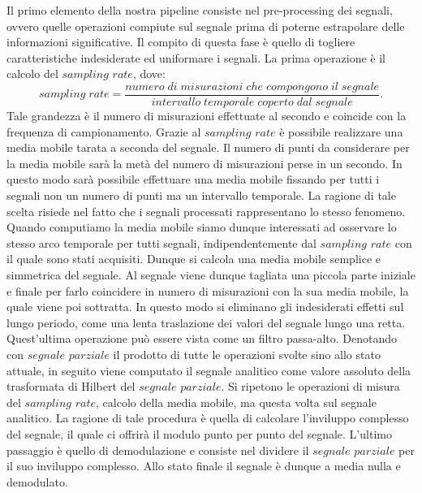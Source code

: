 \documentclass[12pt,a4paper, twoside, openright]{report}
\begin{document}
Il primo elemento della nostra pipeline consiste nel pre-processing dei segnali, ovvero quelle operazioni compiute sul segnale prima di poterne estrapolare delle informazioni significative.
Il compito di questa fase è quello di togliere caratteristiche indesiderate ed uniformare i segnali.
La prima operazione è il calcolo del $sampling$ $rate$, dove:
\begin{equation}
	sampling\; rate = \frac{numero\; di\; misurazioni\; che\; compongono\; il\; 				segnale}{intervallo\; temporale\; coperto\; dal\; segnale}.
\end{equation}
Tale grandezza è il numero di misurazioni effettuate al secondo e coincide con la frequenza di campionamento.
Grazie al $sampling$ $rate$ è possibile realizzare una media mobile tarata a seconda del segnale.
Il numero di punti da considerare per la media mobile sarà la metà del numero di misurazioni perse in un secondo.
In questo modo sarà possibile effettuare una media mobile fissando per tutti i segnali non un numero di punti ma un intervallo temporale.
La ragione di tale scelta risiede nel fatto che i segnali processati rappresentano lo stesso fenomeno.
Quando computiamo la media mobile siamo dunque interessati ad osservare lo stesso arco temporale per tutti segnali, indipendentemente dal $sampling$ $rate$ con il quale sono stati acquisiti.
Dunque si calcola una media mobile semplice e simmetrica del segnale.
Al segnale viene dunque tagliata una piccola parte iniziale e finale per farlo coincidere in numero di misurazioni con la sua media mobile, la quale viene poi sottratta.
In questo modo si eliminano gli indesiderati effetti sul lungo periodo, come una lenta traslazione dei valori del segnale lungo una retta.
Quest'ultima operazione può essere vista come un filtro passa-alto.
Denotando con $segnale$ $parziale$ il prodotto di tutte le operazioni svolte sino allo stato attuale, in seguito viene computato il segnale analitico come valore assoluto della trasformata di Hilbert del $segnale$ $parziale$.
Si ripetono le operazioni di misura del $sampling$ $rate$, calcolo della media mobile, ma questa volta sul segnale analitico.
La ragione di tale procedura è quella di calcolare l'inviluppo complesso del segnale, il quale ci offrirà il modulo punto per punto del segnale.
L'ultimo passaggio è quello di demodulazione e consiste nel dividere il $segnale$ $parziale$ per il suo inviluppo complesso.
Allo stato finale il segnale è dunque a media nulla e demodulato.
%
\end{document}
